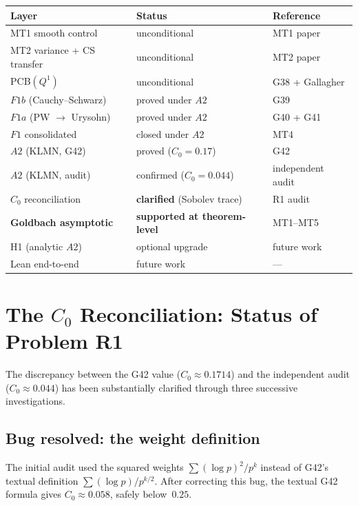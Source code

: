\documentclass[11pt,a4paper]{article}
\begin{document}
\begin{center}
\begin{tabular}{@{}lll@{}}
\toprule
\textbf{Layer} & \textbf{Status} & \textbf{Reference} \\
\midrule
MT1 smooth control & unconditional & MT1 paper \\
MT2 variance + CS transfer & unconditional & MT2 paper \\
PCB$(Q^1)$ & unconditional & G38 + Gallagher \\
$F1b$ (Cauchy--Schwarz) & proved under $A2$ & G39 \\
$F1a$ (PW $\to$ Urysohn) & proved under $A2$ & G40 + G41 \\
$F1$ consolidated & closed under $A2$ & MT4 \\
$A2$ (KLMN, G42) & proved ($C_0=0.17$) & G42 \\
$A2$ (KLMN, audit) & confirmed ($C_0=0.044$) & independent audit \\
$C_0$ reconciliation & \textbf{clarified} (Sobolev trace) & R1 audit \\
\midrule
\textbf{Goldbach asymptotic} & \textbf{supported at theorem-level} & MT1--MT5 \\
\midrule
H1 (analytic $A2$) & optional upgrade & future work \\
Lean end-to-end & future work & --- \\
\bottomrule
\end{tabular}
\end{center}

\section{The $C_0$ Reconciliation: Status of Problem R1}

The discrepancy between the G42 value ($C_0\approx 0.1714$) and the independent audit ($C_0\approx 0.044$) has been substantially clarified through three successive investigations.

\subsection{Bug resolved: the weight definition}

The initial audit used the squared weights $\sum(\log p)^2/p^k$ instead of G42's textual definition $\sum(\log p)/p^{k/2}$.  After correcting this bug, the textual G42 formula gives $C_0\approx 0.058$, safely below~$0.25$.
\end{document}
